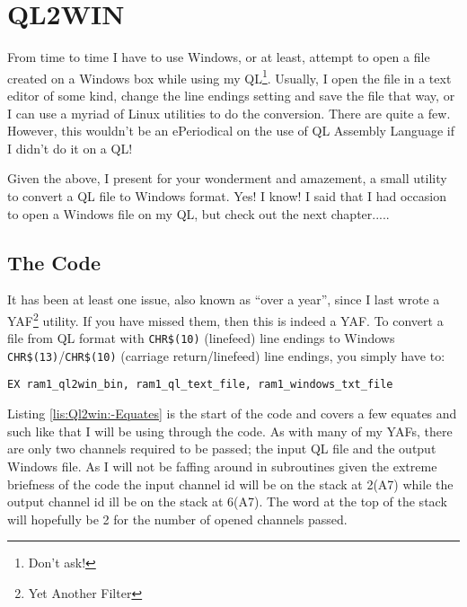 
\chapter{QL2WIN}

From time to time I have to use Windows, or at least, attempt to open
a file created on a Windows box while using my QL\footnote{Don't ask!}.
Usually, I open the file in a text editor of some kind, change the
line endings setting and save the file that way, or I can use a myriad
of Linux utilities to do the conversion. There are quite a few. However,
this wouldn't be an ePeriodical on the use of QL Assembly Language
if I didn't do it on a QL!

Given the above, I present for your wonderment and amazement, a small
utility to convert a QL file to Windows format. Yes! I know! I said
that I had occasion to open a Windows file on my QL, but check out
the next chapter.....

\section{The Code}

It has been at least one issue, also known as ``over a year'', since
I last wrote a YAF\footnote{Yet Another Filter} utility. If you have
missed them, then this is indeed a YAF. To convert a file from QL
format with \lstinline[basicstyle={\ttfamily},showstringspaces=false]!CHR$(10)!
(linefeed) line endings to Windows \lstinline[basicstyle={\ttfamily},showstringspaces=false]!CHR$(13)!/\lstinline[basicstyle={\ttfamily},showstringspaces=false]!CHR$(10)!
(carriage return/linefeed) line endings, you simply have to:

\begin{lstlisting}[basicstyle={\ttfamily},showstringspaces=false,tabsize=1,numbers=none]
EX ram1_ql2win_bin, ram1_ql_text_file, ram1_windows_txt_file
\end{lstlisting}

Listing \ref{lis:Ql2win:-Equates} is the start of the code and covers
a few equates and such like that I will be using through the code.
As with many of my YAFs, there are only two channels required to be
passed; the input QL file and the output Windows file. As I will not
be faffing around in subroutines \textendash{} given the extreme briefness
of the code \textendash{} the input channel id will be on the stack
at 2(A7) while the output channel id ill be on the stack at 6(A7).
The word at the top of the stack will hopefully be 2 for the number
of opened channels passed.

